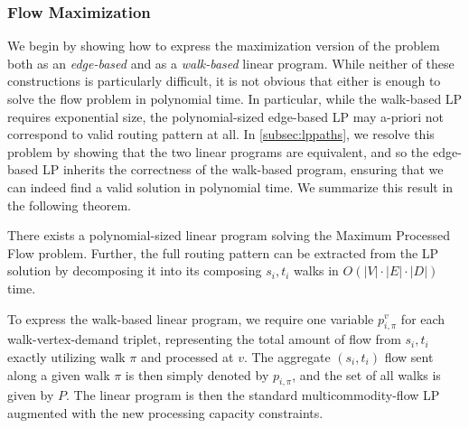 \subsubsection{Flow Maximization}
\label{sec:flowmax}
We begin by showing how to express the maximization version of the problem both as an \textit{edge-based} and as a \textit{walk-based} linear program. While neither of these constructions is particularly difficult, it is not obvious that either is enough to solve the flow problem in polynomial time. In particular, while the walk-based LP requires exponential size, the polynomial-sized edge-based LP may a-priori not correspond to valid routing pattern at all. In \autoref{subsec:lppaths}, we resolve this problem by showing that the two linear programs are equivalent, and so the edge-based LP inherits the correctness of the walk-based program, ensuring that we can indeed find a valid solution in polynomial time. We summarize this result in the following theorem.

\begin{theorem}
\label{thm:flowmax}
There exists a polynomial-sized linear program solving the Maximum Processed Flow problem. Further, the full routing pattern can be extracted from the LP solution by decomposing it into its composing $s_i, t_i$ walks in $O(|V| \cdot |E| \cdot |D|)$ time.
\end{theorem}

To express the walk-based linear program, we require one variable $p_{i,\pi}^v$ for each walk-vertex-demand triplet, representing the total amount of flow from $s_i,t_i$ exactly utilizing walk $\pi$ and processed at $v$. The aggregate $(s_i,t_i)$ flow sent along a given walk $\pi$ is then simply denoted by $p_{i,\pi}$, and the set of all walks is given by $P$. The linear program is then the standard multicommodity-flow LP augmented with the new processing capacity constraints.

